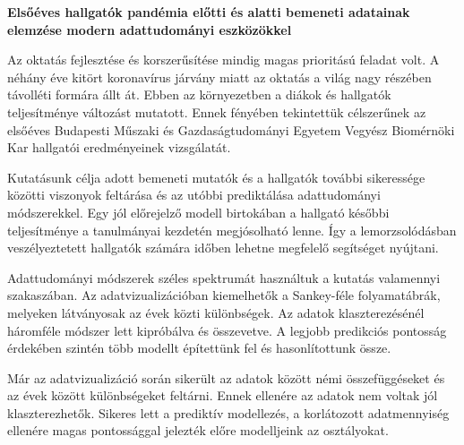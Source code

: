 \documentclass[12pt]{article}
\begin{document}
\begin{center}
\textbf{Elsőéves hallgatók pandémia előtti és alatti bemeneti
adatainak elemzése modern adattudományi
eszközökkel}
\end{center}


Az oktatás fejlesztése és korszerűsítése mindig magas prioritású feladat volt. A néhány éve kitört koronavírus járvány miatt az oktatás a világ nagy részében távolléti formára állt át. Ebben az környezetben a diákok és hallgatók teljesítménye változást mutatott. Ennek fényében tekintettük célszerűnek az elsőéves Budapesti Műszaki és Gazdaságtudományi Egyetem Vegyész Biomérnöki Kar hallgatói eredményeinek vizsgálatát.

Kutatásunk célja adott bemeneti mutatók és a hallgatók további sikeressége közötti viszonyok feltárása és az utóbbi prediktálása adattudományi módszerekkel. Egy jól előrejelző modell birtokában a hallgató későbbi teljesítménye a tanulmányai kezdetén megjósolható lenne. Így a lemorzsolódásban veszélyeztetett hallgatók számára időben lehetne megfelelő segítséget nyújtani.

Adattudományi módszerek széles spektrumát használtuk a kutatás valamennyi szakaszában. Az adatvizualizációban kiemelhetők a Sankey-féle folyamatábrák, melyeken látványosak az évek közti különbségek. Az adatok klaszterezésénél háromféle módszer lett kipróbálva és összevetve. A legjobb predikciós pontosság érdekében szintén több modellt építettünk fel és hasonlítottunk össze.

Már az adatvizualizáció során sikerült az adatok között némi összefüggéseket és az évek között különbségeket feltárni. Ennek ellenére az adatok nem voltak jól klaszterezhetők. Sikeres lett a prediktív modellezés, a korlátozott adatmennyiség ellenére magas pontossággal jelezték előre modelljeink az osztályokat.
\end{document}
